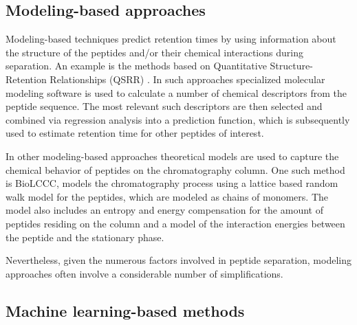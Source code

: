 \documentclass[a4paper]{article}
\begin{document}


\subsection{Modeling-based approaches}

Modeling-based techniques predict retention times by using information
about the structure of the peptides and/or their chemical interactions
during separation. An example is the methods based on Quantitative
Structure-Retention Relationships (QSRR) \cite{Kaliszan2005,
Baczek2005}. In such approaches specialized molecular modeling
software is used to calculate a number of chemical descriptors from
the peptide sequence. The most relevant such descriptors are then
selected and combined via regression analysis into a prediction
function, which is subsequently used to estimate retention time for
other peptides of interest.

In other modeling-based approaches theoretical models are used to
capture the chemical behavior of peptides on the chromatography
column. One such method is BioLCCC, models the chromatography process
using a lattice based random walk model for the peptides, which are
modeled as chains of monomers. The model also includes an entropy and
energy compensation for the amount of peptides residing on the column 
and a model of the interaction energies between the peptide and the
stationary phase. 

Nevertheless, given the numerous factors involved in peptide
separation, modeling approaches often involve a considerable number of
simplifications.
 
\subsection{Machine learning-based methods}
\label{sec:ML}
\end{document}
